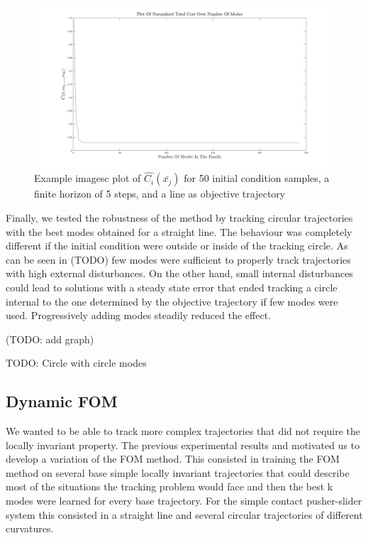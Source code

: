 \documentclass[12,twoside]{TFG-GM}
\theoremstyle{definition}
\theoremstyle{remark}
\newcommand*\diff[1]{\bar{#1}}
\begin{document}
\begin{figure}[htb!]
\begin{center}
\includegraphics[width=16cm]{cost_over_modes.jpg}
\caption{\label{cost_over_modes} \small Example imagesc plot of $\hat{C_i}(\diff{x_j})$ for 50 initial condition samples, a finite horizon of 5 steps, and a line as objective trajectory}
\end{center}
\end{figure}

Finally, we tested the robustness of the method by tracking circular trajectories with the best modes obtained for a straight line. The behaviour was completely different if the initial condition were outside or inside of the tracking circle. As can be seen in (TODO) few modes were sufficient to properly track trajectories with high external disturbances. On the other hand, small internal disturbances could lead to solutions with a steady state error that ended tracking a circle internal to the one determined by the objective trajectory if few modes were used. Progressively adding modes steadily reduced the effect.

(TODO: add graph)

TODO: Circle with circle modes

\subsection{Dynamic FOM}
\label{subsec:dynfom}
We wanted to be able to track more complex trajectories that did not require the locally invariant property. The previous experimental results and motivated us to develop a variation of the FOM method. This consisted in training the FOM method on several base simple locally invariant trajectories that could describe most of the situations the tracking problem would face and then the best k modes were learned for every base trajectory. For the simple contact pusher-slider system this consisted in a straight line and several circular trajectories of different curvatures.
\end{document}
